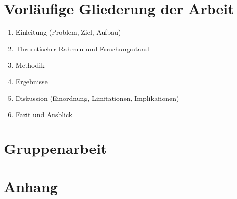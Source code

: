\documentclass[11pt,a4paper]{article}
\begin{document}
\section{Vorläufige Gliederung der Arbeit}

\begin{enumerate}[leftmargin=1cm,label=\arabic*.]
    \item Einleitung (Problem, Ziel, Aufbau)
    \item Theoretischer Rahmen und Forschungsstand
    \item Methodik
    \item Ergebnisse
    \item Diskussion (Einordnung, Limitationen, Implikationen)
    \item Fazit und Ausblick
\end{enumerate}

\section{Gruppenarbeit}


\appendix
\section{Anhang}




\end{document}
